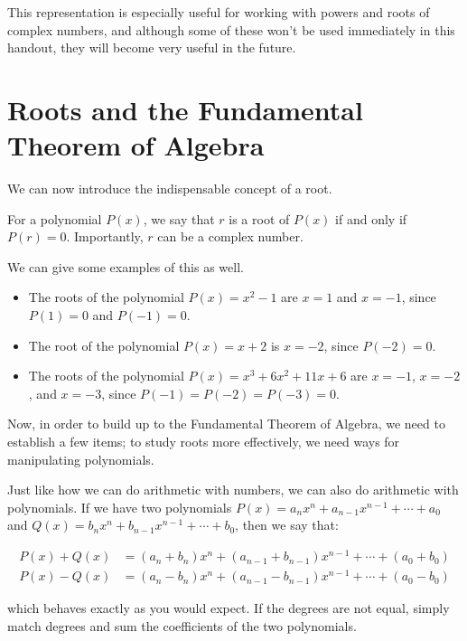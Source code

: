 \documentclass[11pt]{scrartcl}
\begin{document}
This representation is especially useful for working with powers and roots of complex numbers, and although some of these won't be used immediately in this handout, they will become very useful in the future.

\newpage

\section{Roots and the Fundamental Theorem of Algebra}

We can now introduce the indispensable concept of a root.

\begin{definition*}[Root]
For a polynomial $P(x)$, we say that $r$ is a root of $P(x)$ if and only if $P(r) = 0$. Importantly, $r$ can be a complex number.
\end{definition*}

We can give some examples of this as well.

\begin{example*}
\begin{itemize}
\item The roots of the polynomial $P(x) = x^2-1$ are $x = 1$ and $x = -1$, since $P(1) = 0$ and $P(-1) = 0$.
\item The root of the polynomial $P(x) = x+2$ is $x = -2$, since $P(-2) = 0$.
\item The roots of the polynomial $P(x) = x^3+6x^2+11x+6$ are $x = -1$, $x = -2$, and $x = -3$, since $P(-1) = P(-2) = P(-3) = 0$.
\end{itemize}
\end{example*}

Now, in order to build up to the Fundamental Theorem of Algebra, we need to establish a few items; to study roots more effectively, we need ways for manipulating polynomials.

Just like how we can do arithmetic with numbers, we can also do arithmetic with polynomials. If we have two polynomials $P(x) = a_nx^n+a_{n-1}x^{n-1}+\cdots+a_0$ and $Q(x) = b_nx^n+b_{n-1}x^{n-1}+\cdots+b_0$, then we say that:

\begin{align*}
P(x)+Q(x) &= (a_n+b_n)x^n+(a_{n-1}+b_{n-1})x^{n-1}+\cdots+(a_0+b_0) \\
P(x)-Q(x) &= (a_n-b_n)x^n+(a_{n-1}-b_{n-1})x^{n-1}+\cdots+(a_0-b_0)
\end{align*}

which behaves exactly as you would expect. If the degrees are not equal, simply match degrees and sum the coefficients of the two polynomials.
\end{document}
